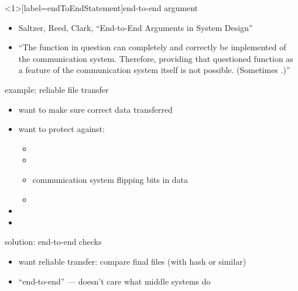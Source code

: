 \begin{frame}<1>[label=endToEndStatement]{end-to-end argument}
    \begin{itemize}
    \item Saltzer, Reed, Clark, ``End-to-End Arguments in System Design''
    \item ``The function in question can completely and correctly be implemented 
     of the communication
    system. Therefore, providing that questioned function as a feature of the communication
    system itself is not possible. (Sometimes 
    .)''
    \end{itemize}
\end{frame}


\begin{frame}{example: reliable file transfer}
    \begin{itemize}
    \item want to make sure correct data transferred
    \vspace{.5cm}
    \item want to protect against:
        \begin{itemize}
        \item {}
        \item {}
        \item communication system flipping bits in data
        \item {}
        \end{itemize}
    \vspace{.5cm}
    \item<2-> 
    \item<3-> 
    \end{itemize}
\end{frame}

\begin{frame}{solution: end-to-end checks}
    \begin{itemize}
    \item want reliable transfer: compare final files (with hash or similar)
    \vspace{.5cm}
    \item ``end-to-end'' --- doesn't care what middle systems do
    \end{itemize}
\end{frame}


